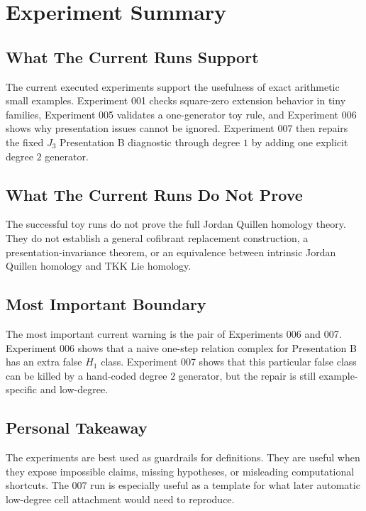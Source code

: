 \chapter{Experiment Summary}

\section{What The Current Runs Support}

The current executed experiments support the usefulness of exact arithmetic
small examples. Experiment 001 checks square-zero extension behavior in tiny
families, Experiment 005 validates a one-generator toy rule, and Experiment 006
shows why presentation issues cannot be ignored. Experiment 007 then repairs
the fixed \(J_3\) Presentation B diagnostic through degree \(1\) by adding one
explicit degree \(2\) generator.

\section{What The Current Runs Do Not Prove}

The successful toy runs do not prove the full Jordan Quillen homology theory.
They do not establish a general cofibrant replacement construction, a
presentation-invariance theorem, or an equivalence between intrinsic Jordan
Quillen homology and TKK Lie homology.

\section{Most Important Boundary}

The most important current warning is the pair of Experiments 006 and 007.
Experiment 006 shows that a naive one-step relation complex for Presentation B
has an extra false \(H_1\) class. Experiment 007 shows that this particular
false class can be killed by a hand-coded degree \(2\) generator, but the
repair is still example-specific and low-degree.

\section{Personal Takeaway}

The experiments are best used as guardrails for definitions. They are useful
when they expose impossible claims, missing hypotheses, or misleading
computational shortcuts. The 007 run is especially useful as a template for
what later automatic low-degree cell attachment would need to reproduce.
